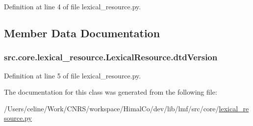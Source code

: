 Definition at line 4 of file lexical\+\_\+resource.\+py.



\subsection{Member Data Documentation}
\hypertarget{classsrc_1_1core_1_1lexical__resource_1_1_lexical_resource_a8c8a0a171fe52f3ef8db4a58898ece0f}{
\subsubsection[{dtd\+Version}]{\setlength{\rightskip}{0pt plus 5cm}src.\+core.\+lexical\+\_\+resource.\+Lexical\+Resource.\+dtd\+Version}}\label{classsrc_1_1core_1_1lexical__resource_1_1_lexical_resource_a8c8a0a171fe52f3ef8db4a58898ece0f}


Definition at line 5 of file lexical\+\_\+resource.\+py.



The documentation for this class was generated from the following file\+:\begin{DoxyCompactItemize}
\item 
/\+Users/celine/\+Work/\+C\+N\+R\+S/workspace/\+Himal\+Co/dev/lib/lmf/src/core/\hyperlink{lexical__resource_8py}{lexical\+\_\+resource.\+py}\end{DoxyCompactItemize}
